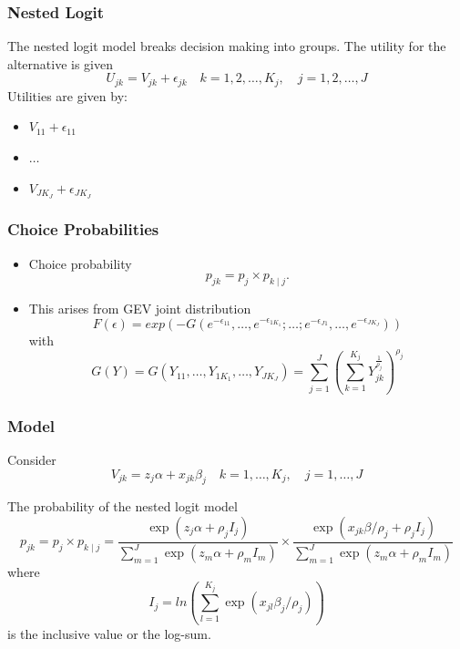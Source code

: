 \documentclass{beamer}
\newcommand{\1}{\mathbb{1}}
\begin{document}
\begin{frame}\frametitle{Nested Logit}
The nested logit model breaks decision making into groups. The utility for the alternative is given
\begin{equation}
 U_{jk} = V_{jk} + \epsilon_{jk} \quad k=1,2,\ldots,K_j, \quad j=1,2,\ldots,J
\end{equation}
Utilities are given by:
\begin{itemize}
 \item $V_{11} + \epsilon_{11}$
 \item $\ldots$
 \item $V_{J K_{J}} + \epsilon_{J K_{J}}$
\end{itemize}

\end{frame}

\begin{frame}\frametitle{Choice Probabilities}
\begin{itemize}
 \item Choice probability
 \begin{equation}
 p_{jk} = p_j \times p_{k \mid j}.
\end{equation}
\item This arises from GEV joint distribution
\begin{equation*}
 F(\epsilon) = exp(-G(e^{-\epsilon_{11}},\ldots,e^{-\epsilon_{1K_{1}}};\ldots;e^{-\epsilon_{J1}},\ldots,e^{-\epsilon_{JK_{J}}}))
\end{equation*}
with 
\begin{equation}
 G(Y) = G(Y_{11},\ldots,Y_{1K_{1}},\ldots,Y_{JK_{J}}) = \sum_{j=1}^{J} \left( \sum_{k=1}^{K_j} Y_{jk}^{\tfrac{1}{\rho_j}}\right)^{\rho_{j}}
\end{equation}
\end{itemize}
\end{frame}

\begin{frame}\frametitle{Model}
Consider
\begin{equation}
 V_{jk} = z_j \alpha + x_{jk}\beta_j \quad k=1,\ldots,K_j, \quad j=1,\ldots,J
\end{equation}

The probability of the nested logit model
\begin{equation*}
p_{jk} = p_j \times p_{k \mid j} = \dfrac{\exp(z_j \alpha + \rho_j I_j)}{\sum_{m=1}^J \exp(z_m\alpha + \rho_m I_m)} \times \dfrac{\exp(x_{jk} \beta / \rho_j + \rho_j I_j)}{\sum_{m=1}^J \exp(z_m\alpha + \rho_m I_m)}
\end{equation*}
where 
\begin{equation*}
 I_j = ln \left( \sum_{l=1}^{K_j} \exp(x_{jl}\beta_j / \rho_j)\right)
\end{equation*}
is the inclusive value or the log-sum.
\end{frame}
\end{document}
